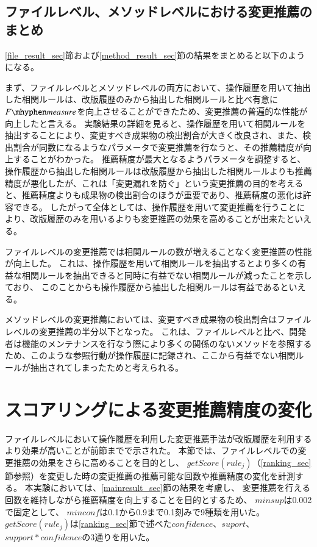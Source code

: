 \documentclass[a4paper]{jsbook}
\newcommand{\minconf}{mincon\!f}
\newcommand{\confidence}{con\!f\!idence}
\newcommand{\fmeasure}{F\mhyphen measure}
\newcommand{\getScore}{getS\!core}
\begin{document}
\subsection{ファイルレベル、メソッドレベルにおける変更推薦のまとめ}
\ref{file_result_sec}節および\ref{method_result_sec}節の結果をまとめると以下のようになる。

まず、ファイルレベルとメソッドレベルの両方において、操作履歴を用いて抽出した相関ルールは、改版履歴のみから抽出した相関ルールと比べ有意に$\fmeasure$を向上させることができたため、変更推薦の普遍的な性能が向上したと言える。
実験結果の詳細を見ると、操作履歴を用いて相関ルールを抽出することにより、変更すべき成果物の検出割合が大きく改良され、また、検出割合が同数になるようなパラメータで変更推薦を行なうと、その推薦精度が向上することがわかった。
推薦精度が最大となるようパラメータを調整すると、操作履歴から抽出した相関ルールは改版履歴から抽出した相関ルールよりも推薦精度が悪化したが、これは「変更漏れを防ぐ」という変更推薦の目的を考えると、推薦精度よりも成果物の検出割合のほうが重要であり、推薦精度の悪化は許容できる。
したがって全体としては、操作履歴を用いて変更推薦を行うことにより、改版履歴のみを用いるよりも変更推薦の効果を高めることが出来たといえる。

ファイルレベルの変更推薦では相関ルールの数が増えることなく変更推薦の性能が向上した。
これは、操作履歴を用いて相関ルールを抽出するとより多くの有益な相関ルールを抽出できると同時に有益でない相関ルールが減ったことを示しており、
このことからも操作履歴から抽出した相関ルールは有益であるといえる。

メソッドレベルの変更推薦においては、変更すべき成果物の検出割合はファイルレベルの変更推薦の半分以下となった。
これは、ファイルレベルと比べ、開発者は機能のメンテナンスを行なう際により多くの関係のないメソッドを参照するため、このような参照行動が操作履歴に記録され、ここから有益でない相関ルールが抽出されてしまったためと考えられる。

\section{スコアリングによる変更推薦精度の変化}\label{varyscoring_sec}
ファイルレベルにおいて操作履歴を利用した変更推薦手法が改版履歴を利用するより効果が高いことが前節までで示された。
本節では、ファイルレベルでの変更推薦の効果をさらに高めることを目的とし、
$\getScore(rule_j)$（\ref{ranking_sec}節参照）を変更した時の変更推薦の推薦可能な回数や推薦精度の変化を計測する。
本実験においては、\ref{mainresult_sec}節の結果を考慮し、
変更推薦を行える回数を維持しながら推薦精度を向上することを目的とするため、
$minsup$は0.002で固定として、
$\minconf$は0.1から0.9まで0.1刻みで9種類を用いた。
$\getScore(rule_j)$は\ref{ranking_sec}節で述べた$\confidence$、$suport$、$support*\confidence$の3通りを用いた。
\end{document}
